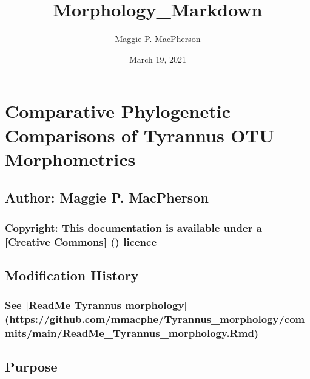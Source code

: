\documentclass[]{article}
\title{Morphology\_Markdown}
\author{Maggie P. MacPherson}
\date{March 19, 2021}
\newenvironment{Shaded}{\begin{snugshade}}{\end{snugshade}}
\newcommand{\KeywordTok}[1]{\textcolor[rgb]{0.13,0.29,0.53}{\textbf{#1}}}
\newcommand{\OperatorTok}[1]{\textcolor[rgb]{0.81,0.36,0.00}{\textbf{#1}}}
\newcommand{\NormalTok}[1]{#1}
\begin{document}
\maketitle

\begin{Shaded}
\end{Shaded}

\section{Comparative Phylogenetic Comparisons of Tyrannus OTU
Morphometrics}\label{comparative-phylogenetic-comparisons-of-tyrannus-otu-morphometrics}

\subsection{Author: Maggie P.
MacPherson}\label{author-maggie-p.-macpherson}

\subsubsection{Copyright: This documentation is available under a
{[}Creative Commons{]} ()
licence}\label{copyright-this-documentation-is-available-under-a-creative-commons-licence}

\subsection{Modification History}\label{modification-history}

\subsubsection{\texorpdfstring{See {[}ReadMe Tyrannus morphology{]}
(\url{https://github.com/mmacphe/Tyrannus_morphology/commits/main/ReadMe_Tyrannus_morphology.Rmd})}{See {[}ReadMe Tyrannus morphology{]} (https://github.com/mmacphe/Tyrannus\_morphology/commits/main/ReadMe\_Tyrannus\_morphology.Rmd)}}\label{see-readme-tyrannus-morphology-httpsgithub.commmacphetyrannus_morphologycommitsmainreadme_tyrannus_morphology.rmd}

\subsection{Purpose}\label{purpose}
\end{document}
